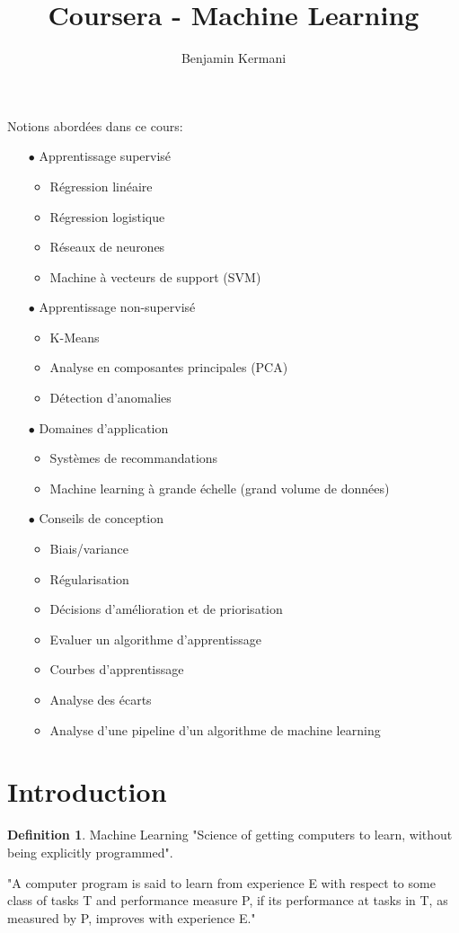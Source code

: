 \documentclass{article}
\title{Coursera - Machine Learning}
\author{Benjamin Kermani}
\theoremstyle{definition}
\newtheorem{definition}{Definition}[section]
\begin{document}
\maketitle
\begin{center}
Notions abordées dans ce cours:
\end{center}
\begin{itemize}
\item[$\bullet$] Apprentissage supervisé
	\begin{itemize}
		\item Régression linéaire
		\item Régression logistique
		\item Réseaux de neurones
		\item Machine à vecteurs de support (SVM)
	\end{itemize}
\item[$\bullet$] Apprentissage non-supervisé
	\begin{itemize}
		\item K-Means
		\item Analyse en composantes principales (PCA)
		\item Détection d'anomalies
	\end{itemize}
\item[$\bullet$] Domaines d'application
	\begin{itemize}
		\item Systèmes de recommandations
		\item Machine learning à grande échelle (grand volume de données)
	\end{itemize}
\item[$\bullet$] Conseils de conception
	\begin{itemize}
		\item Biais/variance
		\item Régularisation
		\item Décisions d'amélioration et de priorisation
		\item Evaluer un algorithme d'apprentissage
		\item Courbes d'apprentissage
		\item Analyse des écarts
		\item Analyse d'une pipeline d'un algorithme de machine learning
	\end{itemize}
\end{itemize}
\newpage
\tableofcontents
\newpage
\section{Introduction}
\begin{definition}{Machine Learning}
"Science of getting computers to learn, without being explicitly programmed".
\end{definition}
"A computer program is said to learn from experience E with respect to some class of tasks T and performance measure P, if its performance at tasks in T, as measured by P, improves with experience E."	\par
\end{document}
